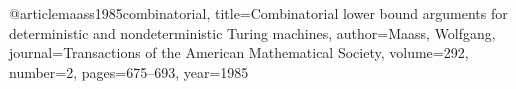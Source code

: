 @article{maass1985combinatorial,
  title={Combinatorial lower bound arguments for deterministic and nondeterministic Turing machines},
  author={Maass, Wolfgang},
  journal={Transactions of the American Mathematical Society},
  volume={292},
  number={2},
  pages={675--693},
  year={1985}
}